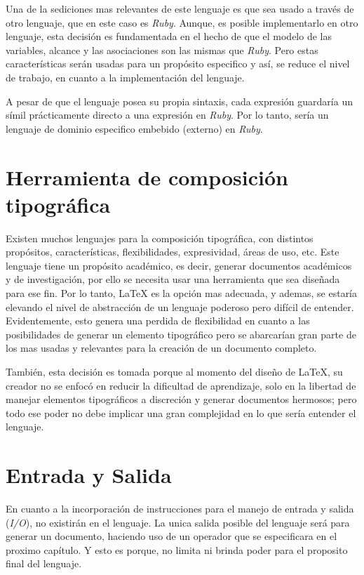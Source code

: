 \documentclass[12pt,letterpaper,titlepage,oneside,openright]{book}
\newcommand{\OhTeX}{%
    \makebox[0.76em][c]{O}%
    \makebox[0.25em][c]{%
        \raisebox{0.14em}[0em][0em]{%
            \fontsize{0.5em}{0cm}%
                \selectfont H%
        }%
    }%
    \makebox[1.35em][c]{\TeX}%
}
\newcommand{\latex}{\LaTeX\xspace}
\newcommand{\ohtex}{\OhTeX\xspace}
\newcommand{\ruby}{\textit{Ruby}\xspace}
\begin{document}
Una de la sediciones mas relevantes de este lenguaje es que sea usado a través
de otro lenguaje, que en este caso es \ruby. Aunque, es posible implementarlo en
otro lenguaje, esta decisión es fundamentada en el hecho de que el modelo de las
variables, alcance y las asociaciones son las mismas que \ruby. Pero estas
características serán usadas para un propósito especifico y así, se reduce el
nivel de trabajo, en cuanto a la implementación del lenguaje.

A pesar de que el lenguaje posea su propia sintaxis, cada expresión guardaría un
símil prácticamente directo a una expresión en \ruby. Por lo tanto, \ohtex sería
un lenguaje de dominio especifico embebido (externo) en \ruby.

\section{Herramienta de composición tipográfica}

Existen muchos lenguajes para la composición tipográfica, con distintos
propósitos, características, flexibilidades, expresividad, áreas de uso, etc.
Este lenguaje tiene un propósito académico, es decir, generar documentos
académicos y de investigación, por ello se necesita usar una herramienta que sea
diseñada para ese fin. Por lo tanto, \latex es la opción mas adecuada, y ademas,
se estaría elevando el nivel de abstracción de un lenguaje poderoso pero difícil
de entender. Evidentemente, esto genera una perdida de flexibilidad en cuanto a
las posibilidades de generar un elemento tipográfico pero se abarcarían gran
parte de los mas usadas y relevantes para la creación de un documento completo.

También, esta decisión es tomada porque al momento del diseño de \latex, su
creador no se enfocó en reducir la dificultad de aprendizaje, solo en la libertad
de manejar elementos tipográficos a discreción y generar documentos hermosos;
pero todo ese poder no debe implicar una gran complejidad en lo que sería
entender el lenguaje.

\section{Entrada y Salida}

En cuanto a la incorporación de instrucciones para el manejo de entrada y salida
(\textit{I/O}), no existirán en el lenguaje. La unica salida posible del
lenguaje será para generar un documento, haciendo uso de un operador que se
especificara en el proximo capítulo. Y esto es porque, no limita ni brinda poder
para el proposito final del lenguaje.
\end{document}
